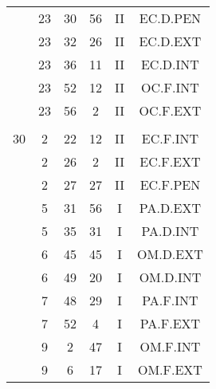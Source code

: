 \documentclass[12pt, a4paper]{article}
\begin{document}
\begin{multicols}{3}
{\begin{tabular}{c c c c c c}
	 	 	 	 & 23 & 30 & 56 & II & EC.D.PEN\\%
	 	 	 	 & 23 & 32 & 26 & II & EC.D.EXT\\%
	 	 	 	 & 23 & 36 & 11 & II & EC.D.INT\\%
	 	 	 	 & 23 & 52 & 12 & II & OC.F.INT\\%
	 	 	 	 & 23 & 56 & 2 & II & OC.F.EXT\\%
	 	 	 	 & & & & & \\%
	 	 	 	30 & 2 & 22 & 12 & II & EC.F.INT\\%
	 	 	 	 & 2 & 26 & 2 & II & EC.F.EXT\\%
	 	 	 	 & 2 & 27 & 27 & II & EC.F.PEN\\%
	 	 	 	 & 5 & 31 & 56 & I & PA.D.EXT\\%
	 	 	 	 & 5 & 35 & 31 & I & PA.D.INT\\%
	 	 	 	 & 6 & 45 & 45 & I & OM.D.EXT\\%
	 	 	 	 & 6 & 49 & 20 & I & OM.D.INT\\%
	 	 	 	 & 7 & 48 & 29 & I & PA.F.INT\\%
	 	 	 	 & 7 & 52 & 4 & I & PA.F.EXT\\%
	 	 	 	 & 9 & 2 & 47 & I & OM.F.INT\\%
	 	 	 	 & 9 & 6 & 17 & I & OM.F.EXT\\%
	 	 \end{tabular}
 	}
\end{multicols}
\end{document}
